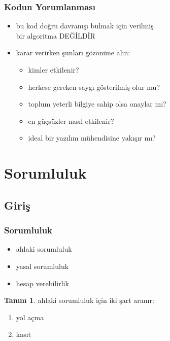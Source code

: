 \documentclass[dvipsnames]{beamer}
\theoremstyle{definition}
\newtheorem{tanim}[theorem]{Tanım}
\theoremstyle{example}
\theoremstyle{plain}
\begin{document}
\begin{frame}
  \frametitle{Kodun Yorumlanması}

  \begin{itemize}
    \item bu kod doğru davranışı bulmak için verilmiş\\
      bir algoritma \alert{DEĞİLDİR}

    \pause
    \item karar verirken şunları gözönüne alın:

    \begin{itemize}
      \item kimler etkilenir?
      \item herkese gereken saygı gösterilmiş olur mu?
      \item toplum yeterli bilgiye sahip olsa onaylar mı?
      \item en güçsüzler nasıl etkilenir?
      \item ideal bir yazılım mühendisine yakışır mı?
    \end{itemize}
  \end{itemize}
\end{frame}

\section{Sorumluluk}

\subsection{Giriş}

\begin{frame}
  \frametitle{Sorumluluk}

  \begin{itemize}
    \item ahlaki sorumluluk
    \item yasal sorumluluk

    \medskip
    \item hesap verebilirlik
  \end{itemize}

  \pause
  \begin{tanim}
    ahlaki sorumluluk için iki şart aranır:

    \begin{enumerate}
      \item yol açma
      \item kasıt
    \end{enumerate}
  \end{tanim}
\end{frame}
\end{document}

